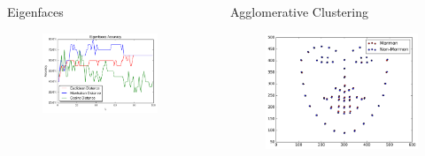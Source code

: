 \documentclass[final]{beamer}
\newlength{\sepwid}
\newlength{\onecolwid}
\begin{document}
\begin{frame}[t]
\begin{columns}[t]
\begin{column}{\onecolwid}
\begin{block}{Eigenfaces}
\begin{figure}
\centering
  \centering
  \includegraphics[width=.85\linewidth]{../data/Accuracy.pdf}
  \label{fig:eig_acc}
\end{figure}

\end{block}



\end{column} %




\begin{column}{\sepwid}\end{column}

\begin{column}{\onecolwid}

\begin{block}{Agglomerative Clustering}

\begin{figure}
\centering
  \includegraphics[width=.85\linewidth]{../data/average_sift.pdf}
  \label{fig:sift_avg}
\end{figure}


\end{block}
\end{column}
\end{columns}
\end{frame}
\end{document}
